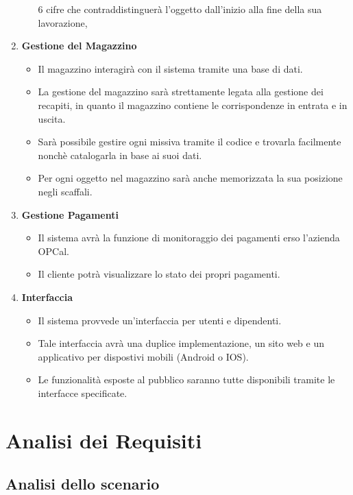 \documentclass[a4paper,12pt]{article}
\begin{document}
\begin{enumerate}
\begin{itemize}
        6 cifre che contraddistinguerà l'oggetto dall'inizio alla fine della sua lavorazione,
    \end{itemize}
  \item \textbf{Gestione del Magazzino} \begin{itemize}
      \item Il magazzino interagirà con il sistema tramite una base di dati.
      \item La gestione del magazzino sarà strettamente legata alla gestione dei recapiti, in quanto il magazzino contiene 
        le corrispondenze in entrata e in uscita.
      \item Sarà possibile gestire ogni missiva tramite il codice e trovarla facilmente nonchè catalogarla in base ai suoi dati.
      \item Per ogni oggetto nel magazzino sarà anche memorizzata la sua posizione negli scaffali.
    \end{itemize}
  \item \textbf{Gestione Pagamenti} \begin{itemize}
      \item Il sistema avrà la funzione di monitoraggio dei pagamenti erso l'azienda OPCal.
      \item Il cliente potrà visualizzare lo stato dei propri pagamenti.
    \end{itemize}
  \item \textbf{Interfaccia} \begin{itemize}
      \item Il sistema provvede un'interfaccia per utenti e dipendenti.
      \item Tale interfaccia avrà una duplice implementazione, un sito web e un applicativo per dispostivi mobili (Android o IOS).
      \item Le funzionalità esposte al pubblico saranno tutte disponibili tramite le interfacce specificate.
    \end{itemize}
\end{enumerate}

\newpage
\section{Analisi dei Requisiti}
\subsection{Analisi dello scenario}
\end{document}
